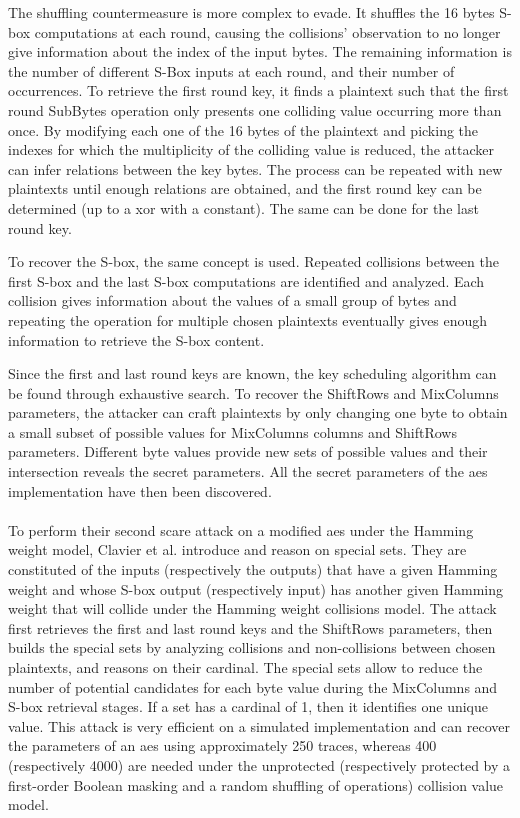 \documentclass[11pt]{sdm}
\begin{document}
The shuffling countermeasure is more complex to evade.
It shuffles the 16 bytes S-box computations at each round, causing the collisions' observation to no longer give information about the index of the input bytes.
The remaining information is the number of different S-Box inputs at each round, and their number of occurrences.
To retrieve the first round key, it finds a plaintext such that the first round SubBytes operation only presents one colliding value occurring more than once.
By modifying each one of the 16 bytes of the plaintext and picking the indexes for which the multiplicity of the colliding value is reduced, the attacker can infer relations between the key bytes.
The process can be repeated with new plaintexts until enough relations are obtained, and the first round key can be determined (up to a xor with a constant).
The same can be done for the last round key.

To recover the S-box, the same concept is used.
Repeated collisions between the first S-box and the last S-box computations are identified and analyzed.
Each collision gives information about the values of a small group of bytes and repeating the operation for multiple chosen plaintexts eventually gives enough information to retrieve the S-box content.

Since the first and last round keys are known, the key scheduling algorithm can be found through exhaustive search.
To recover the ShiftRows and MixColumns parameters, the attacker can craft plaintexts by only changing one byte to obtain a small subset of possible values for MixColumns columns and ShiftRows parameters.
Different byte values provide new sets of possible values and their intersection reveals the secret parameters.
All the secret parameters of the \gls{aes} implementation have then been discovered.

\paragraph{}
To perform their second \gls{scare} attack on a modified \gls{aes} under the Hamming weight model, Clavier et al. introduce and reason on special sets.
They are constituted of the inputs (respectively the outputs) that have a given Hamming weight and whose S-box output (respectively input) has another given Hamming weight that will collide under the Hamming weight collisions model.
The attack first retrieves the first and last round keys and the ShiftRows parameters, then builds the special sets by analyzing collisions and non-collisions between chosen plaintexts, and reasons on their cardinal.
The special sets allow to reduce the number of potential candidates for each byte value during the MixColumns and S-box retrieval stages.
If a set has a cardinal of 1, then it identifies one unique value.
This attack is very efficient on a simulated implementation and can recover the parameters of an \gls{aes} using approximately 250 traces, whereas 400 (respectively 4000) are needed under the unprotected (respectively protected by a first-order Boolean masking and a random shuffling of operations) collision value model.
\end{document}
